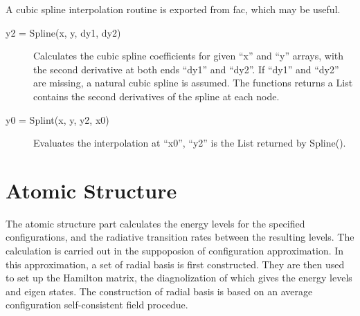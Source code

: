 \documentclass[12pt]{article}
\begin{document}
A cubic spline interpolation routine is exported from fac, which may be
useful. 
\begin{description}
\item[y2 = Spline(x, y, dy1, dy2)]
Calculates the cubic spline coefficients for given ``x'' and ``y'' arrays,
with the second derivative at both ends ``dy1'' and ``dy2''. If ``dy1'' and
``dy2'' are missing, a natural cubic spline is assumed. The functions returns
a List contains the second derivatives of the spline at each node.

\item[y0 = Splint(x, y, y2, x0)] 
Evaluates the interpolation at ``x0'', ``y2'' is the List returned by
Spline(). 
\end{description}

\section{Atomic Structure}
The atomic structure part calculates the energy levels for the specified
configurations, and the radiative transition rates between the resulting
levels. The calculation is carried out in the suppoposion of configuration
approximation. In this approximation, a set of radial basis is first
constructed. They are then used to set up the Hamilton matrix, the
diagnolization of which gives the energy levels and eigen states. The
construction of radial basis is based on an average configuration
self-consistent field procedue. 
\end{document}
